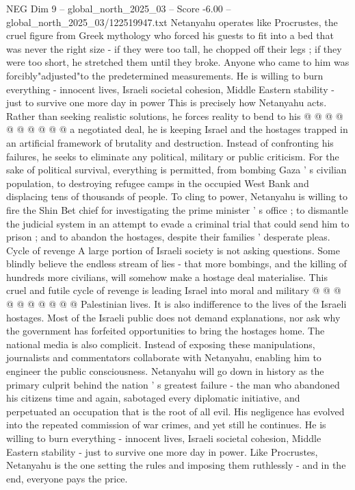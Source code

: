 \begin{textsample}{NEG Dim 9 – global\_north\_2025\_03 – Score -6.00 – global\_north\_2025\_03/122519947.txt}
Netanyahu operates like Procrustes, the cruel figure from Greek mythology who forced his guests to fit into a bed that was never the right size - if they were too tall, he chopped off their legs ; if they were too short, he stretched them until they broke.
Anyone who came to him was forcibly"adjusted"to the predetermined measurements.
He is willing to burn everything - innocent lives, Israeli societal cohesion, Middle Eastern stability - just to survive one more day in power This is precisely how Netanyahu acts.
Rather than seeking realistic solutions, he forces reality to bend to his @ @ @ @ @ @ @ @ @ @ a negotiated deal, he is keeping Israel and the hostages trapped in an artificial framework of brutality and destruction.
Instead of confronting his failures, he seeks to eliminate any political, military or public criticism.
For the sake of political survival, everything is permitted, from bombing Gaza ' s civilian population, to destroying refugee camps in the occupied West Bank and displacing tens of thousands of people.
To cling to power, Netanyahu is willing to fire the Shin Bet chief for investigating the prime minister ' s office ; to dismantle the judicial system in an attempt to evade a criminal trial that could send him to prison ; and to abandon the hostages, despite their families ' desperate pleas.
Cycle of revenge A large portion of Israeli society is not asking questions.
Some blindly believe the endless stream of lies - that more bombings, and the killing of hundreds more civilians, will somehow make a hostage deal materialise.
This cruel and futile cycle of revenge is leading Israel into moral and military @ @ @ @ @ @ @ @ @ @ Palestinian lives.
It is also indifference to the lives of the Israeli hostages.
Most of the Israeli public does not demand explanations, nor ask why the government has forfeited opportunities to bring the hostages home.
The national media is also complicit.
Instead of exposing these manipulations, journalists and commentators collaborate with Netanyahu, enabling him to engineer the public consciousness.
Netanyahu will go down in history as the primary culprit behind the nation ' s greatest failure - the man who abandoned his citizens time and again, sabotaged every diplomatic initiative, and perpetuated an occupation that is the root of all evil.
His negligence has evolved into the repeated commission of war crimes, and yet still he continues.
He is willing to burn everything - innocent lives, Israeli societal cohesion, Middle Eastern stability - just to survive one more day in power.
Like Procrustes, Netanyahu is the one setting the rules and imposing them ruthlessly - and in the end, everyone pays the price.

\end{textsample}
